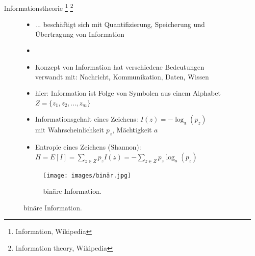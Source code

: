\documentclass[aspectratio=1610, 9pt]{beamer}
\begin{document}
\begin{frame}{Informationstheorie \footnote[3]{Information, Wikipedia} \footnote[4]{Information theory, Wikipedia}}
  \begin{figure}
    \begin{minipage}{0.7\textwidth}
      \begin{itemize}
        \item[] ... beschäftigt sich mit Quantifizierung, Speicherung und Übertragung von Information
        \item[]
        \item Konzept von Information hat verschiedene Bedeutungen \\verwandt mit: Nachricht, Kommunikation, Daten, Wissen
        \item hier: Information ist Folge von Symbolen aus einem Alphabet $Z = \{z_1, z_2,...,z_m\}$
        \item Informationsgehalt eines Zeichens: $I(z) = -\log_a(p_z)$ \\mit Wahrscheinlichkeit $p_z$, Mächtigkeit $a$
        \item Entropie eines Zeichens (Shannon): $H = E[I] = \sum_{z \in Z}{p_z I(z)} = - \sum_{z \in Z}{ p_z \log_a(p_z)}$
      \end{itemize}
    \end{minipage}
    \hfill
    \begin{minipage}{0.28\textwidth}
      \begin{figure}
        \texttt{[image: images/binär.jpg]}
        \caption{binäre Information. \footnotemark[2]}
      \end{figure}
    \end{minipage}
  \end{figure}
\end{frame}
\end{document}
